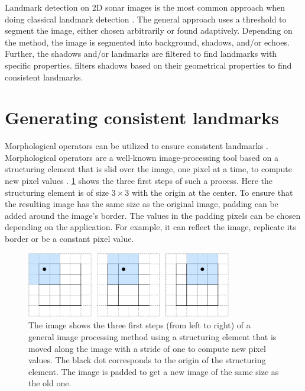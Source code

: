 Landmark detection on 2D sonar images is the most common approach when doing classical landmark detection \cite{Wang2017UnderwaterSonar, Siantidis2016SideVehicles, Yuan2016AnNavigation, Leblond2019SonarProject}. The general approach uses a threshold to segment the image, either chosen arbitrarily or found adaptively. Depending on the method, the image is segmented into background, shadows, and/or echoes. Further, the shadows and/or landmarks are filtered to find landmarks with specific properties. \cite{Leblond2019SonarProject} filters shadows based on their geometrical properties to find consistent landmarks. 

\section{Generating consistent landmarks}

Morphological operators can be utilized to ensure consistent landmarks \cite{Yuan2016AnNavigation}. Morphological operators are a well-known image-processing tool based on a structuring element that is slid over the image, one pixel at a time, to compute new pixel values \cite{Gonzalez2018DigitalProcessing}. \cref{fig:image_processing_basics} shows the three first steps of such a process. Here the structuring element is of size $3\times3$ with the origin at the center. To ensure that the resulting image has the same size as the original image, padding can be added around the image's border. The values in the padding pixels can be chosen depending on the application. For example, it can reflect the image, replicate its border or be a constant pixel value.  

\begin{figure}
    \centering
    \includegraphics[width=0.8\textwidth]{figures/Image_processing_essentials.drawio.pdf}
    \caption{The image shows the three first steps (from left to right) of a general image processing method using a structuring element that is moved along the image with a stride of one to compute new pixel values. The black dot corresponds to the origin of the structuring element. The image is padded to get a new image of the same size as the old one.}
    \label{fig:image_processing_basics}
\end{figure}

